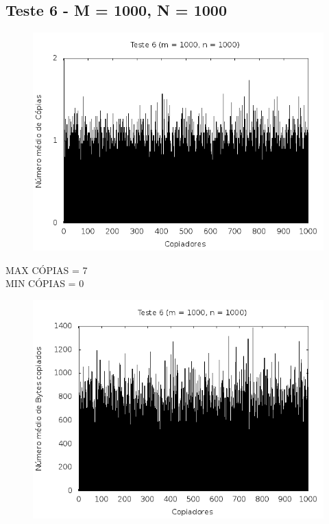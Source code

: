 \documentclass[12pt,a4paper]{article}
\begin{document}
\pagebreak
\subsection{Teste 6 - M = 1000, N = 1000}
\begin{center}
\begin{figure}[H]
    \center
    \includegraphics[scale=0.5]{imagens/grafico_copias6.png}
    \label{teste6_copias}
\end{figure}
\end{center}

MAX CÓPIAS = 7
\\
MIN CÓPIAS = 0

\begin{center}
\begin{figure}[H]
    \center
    \includegraphics[scale=0.5]{imagens/grafico_bytes6.png}
    \label{teste6_bytes}
\end{figure}
\end{center}
\end{document}
